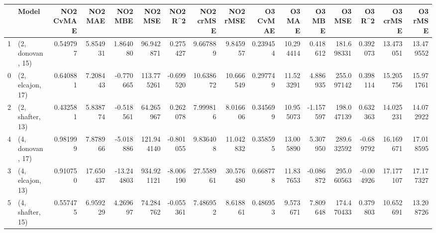 \begin{tabular}{llrrrrrrrrrrrrrr}
\toprule
{} &             Model &  NO2 CvMAE &    NO2 MAE &    NO2 MBE &     NO2 MSE &   NO2 R\textasciicircum2 &  NO2 crMSE &   NO2 rMSE &  O3 CvMAE &     O3 MAE &    O3 MBE &      O3 MSE &    O3 R\textasciicircum2 &   O3 crMSE &    O3 rMSE \\
\midrule
1 &  (2, donovan, 15) &   0.549797 &   5.854931 &   1.864080 &   96.942871 &  0.275427 &   9.667889 &   9.845957 &  0.239454 &  10.294414 &  0.418612 &  181.698331 &  0.392073 &  13.473051 &  13.479552 \\
0 &  (2, elcajon, 17) &   0.640881 &   7.208443 &  -0.770665 &  113.775261 & -0.699520 &  10.638672 &  10.666549 &  0.297749 &  11.523291 &  4.886935 &  255.097142 &  0.398114 &  15.205756 &  15.971761 \\
2 &  (2, shafter, 13) &   0.432581 &   5.838774 &  -0.518561 &   64.265967 &  0.262078 &   7.999816 &   8.016606 &  0.345699 &  10.955073 & -1.157597 &  198.047139 &  0.632363 &  14.025231 &  14.072922 \\
4 &  (4, donovan, 17) &   0.981999 &   7.878966 &  -5.018886 &  121.944140 & -0.801055 &   9.836408 &  11.042832 &  0.358595 &  13.005890 &  5.307950 &  289.632592 & -0.689792 &  16.169671 &  17.018595 \\
3 &  (4, elcajon, 13) &   0.910750 &  17.650437 & -13.244803 &  934.921121 & -8.006190 &  27.558961 &  30.576480 &  0.668778 &  11.837653 & -0.086872 &  295.060563 & -0.004926 &  17.177107 &  17.177327 \\
5 &  (4, shafter, 15) &   0.557475 &   6.959229 &   4.269697 &   74.284762 & -0.055361 &   7.486952 &   8.618861 &  0.486953 &   9.573671 &  7.809648 &  174.470433 &  0.379803 &  10.652691 &  13.208726 \\
\bottomrule
\end{tabular}
